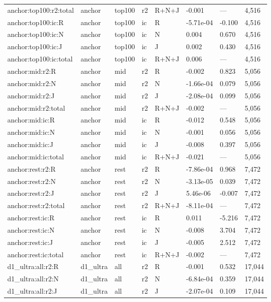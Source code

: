 \begin{tabular}{llllllll}
anchor:top100:r2:total & anchor & top100 & r2 & R+N+J & -0.001 & — & 4,516 \\
anchor:top100:ic:R & anchor & top100 & ic & R & -5.71e-04 & -0.100 & 4,516 \\
anchor:top100:ic:N & anchor & top100 & ic & N & 0.004 & 0.670 & 4,516 \\
anchor:top100:ic:J & anchor & top100 & ic & J & 0.002 & 0.430 & 4,516 \\
anchor:top100:ic:total & anchor & top100 & ic & R+N+J & 0.006 & — & 4,516 \\
anchor:mid:r2:R & anchor & mid & r2 & R & -0.002 & 0.823 & 5,056 \\
anchor:mid:r2:N & anchor & mid & r2 & N & -1.66e-04 & 0.079 & 5,056 \\
anchor:mid:r2:J & anchor & mid & r2 & J & -2.08e-04 & 0.099 & 5,056 \\
anchor:mid:r2:total & anchor & mid & r2 & R+N+J & -0.002 & — & 5,056 \\
anchor:mid:ic:R & anchor & mid & ic & R & -0.012 & 0.548 & 5,056 \\
anchor:mid:ic:N & anchor & mid & ic & N & -0.001 & 0.056 & 5,056 \\
anchor:mid:ic:J & anchor & mid & ic & J & -0.008 & 0.397 & 5,056 \\
anchor:mid:ic:total & anchor & mid & ic & R+N+J & -0.021 & — & 5,056 \\
anchor:rest:r2:R & anchor & rest & r2 & R & -7.86e-04 & 0.968 & 7,472 \\
anchor:rest:r2:N & anchor & rest & r2 & N & -3.13e-05 & 0.039 & 7,472 \\
anchor:rest:r2:J & anchor & rest & r2 & J & 5.46e-06 & -0.007 & 7,472 \\
anchor:rest:r2:total & anchor & rest & r2 & R+N+J & -8.11e-04 & — & 7,472 \\
anchor:rest:ic:R & anchor & rest & ic & R & 0.011 & -5.216 & 7,472 \\
anchor:rest:ic:N & anchor & rest & ic & N & -0.008 & 3.704 & 7,472 \\
anchor:rest:ic:J & anchor & rest & ic & J & -0.005 & 2.512 & 7,472 \\
anchor:rest:ic:total & anchor & rest & ic & R+N+J & -0.002 & — & 7,472 \\
d1\_ultra:all:r2:R & d1\_ultra & all & r2 & R & -0.001 & 0.532 & 17,044 \\
d1\_ultra:all:r2:N & d1\_ultra & all & r2 & N & -6.84e-04 & 0.359 & 17,044 \\
d1\_ultra:all:r2:J & d1\_ultra & all & r2 & J & -2.07e-04 & 0.109 & 17,044 \\

\end{tabular}
